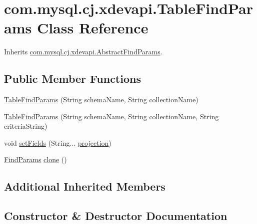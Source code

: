 \hypertarget{classcom_1_1mysql_1_1cj_1_1xdevapi_1_1_table_find_params}{}\section{com.\+mysql.\+cj.\+xdevapi.\+Table\+Find\+Params Class Reference}
\label{classcom_1_1mysql_1_1cj_1_1xdevapi_1_1_table_find_params}


Inherits \mbox{\hyperlink{classcom_1_1mysql_1_1cj_1_1xdevapi_1_1_abstract_find_params}{com.\+mysql.\+cj.\+xdevapi.\+Abstract\+Find\+Params}}.

\subsection*{Public Member Functions}
\begin{DoxyCompactItemize}
\item 
\mbox{\hyperlink{classcom_1_1mysql_1_1cj_1_1xdevapi_1_1_table_find_params_a9219160b4d3eff0893ca5ec7c69d67b9}{Table\+Find\+Params}} (String schema\+Name, String collection\+Name)
\item 
\mbox{\hyperlink{classcom_1_1mysql_1_1cj_1_1xdevapi_1_1_table_find_params_a147c8ae664bdb6b463cbd1d73ad0cc8e}{Table\+Find\+Params}} (String schema\+Name, String collection\+Name, String criteria\+String)
\item 
void \mbox{\hyperlink{classcom_1_1mysql_1_1cj_1_1xdevapi_1_1_table_find_params_a94e20b606a6c17ac6990fab5c212555b}{set\+Fields}} (String... \mbox{\hyperlink{classcom_1_1mysql_1_1cj_1_1xdevapi_1_1_abstract_find_params_aa2f21464c6948fd8938d5663b997a18a}{projection}})
\item 
\mbox{\hyperlink{interfacecom_1_1mysql_1_1cj_1_1xdevapi_1_1_find_params}{Find\+Params}} \mbox{\hyperlink{classcom_1_1mysql_1_1cj_1_1xdevapi_1_1_table_find_params_a5c3b902bd92cc129bd45fc65edb682c7}{clone}} ()
\end{DoxyCompactItemize}
\subsection*{Additional Inherited Members}


\subsection{Constructor \& Destructor Documentation}
\mbox{\label{classcom_1_1mysql_1_1cj_1_1xdevapi_1_1_table_find_params_a9219160b4d3eff0893ca5ec7c69d67b9}} 
